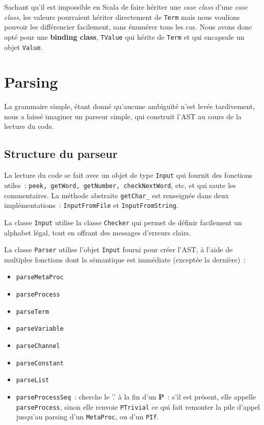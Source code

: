 \documentclass[11pt]{article} %
\begin{document}
Sachant qu'il est impossible en Scala de faire hériter une \emph{case class} d'une \emph{case class}, les valeurs pourraient hériter directement de \texttt{Term} mais nous voulions pouvoir les différencier facilement, sans énumérer tous les cas. Nous avons donc opté pour une \textbf{binding class}, \texttt{TValue} qui hérite de \texttt{Term} et qui encapsule un objet \texttt{Value}.

\section{Parsing}

La grammaire simple, étant donné qu'aucune ambiguïté n'est levée tardivement, nous a laissé imaginer un parseur simple, qui construit l'AST au cours de la lecture du code.

\subsection{Structure du parseur}

La lecture du code se fait avec un objet de type \texttt{Input} qui fournit des fonctions utiles~: \texttt{peek, getWord, getNumber, checkNextWord}, etc, et qui saute les commentaires.
La méthode abstraite \texttt{getChar\_} est renseignée dans deux implémentations~: \texttt{InputFromFile} et \texttt{InputFromString}.

La classe \texttt{Input} utilise la classe \texttt{Checker} qui permet de définir facilement un alphabet légal, tout en  offrant des messages d'erreurs clairs.

La classe \texttt{Parser} utilise l'objet \texttt{Input} fourni pour créer l'AST, à l'aide de multiples fonctions dont la sémantique est immédiate (exceptée la dernière)~: 
\begin{itemize}
\item \texttt{parseMetaProc} 
\item \texttt{parseProcess}
\item \texttt{parseTerm}
\item \texttt{parseVariable}
\item \texttt{parseChannel}
\item \texttt{parseConstant}
\item \texttt{parseList}
\item \texttt{parseProcessSeq}~: cherche le '.' à la fin d'un \textbf{P}~: s'il est présent, elle appelle \texttt{parseProcess}, sinon elle renvoie \texttt{PTrivial} ce qui fait remonter la pile d'appel jusqu'au parsing d'un \texttt{MetaProc}, ou d'un \texttt{PIf}.
\end{itemize}
\end{document}
